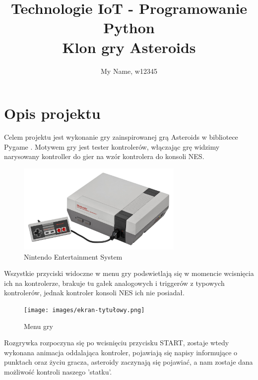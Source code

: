 \documentclass[12pt,a4paper]{article}
\begin{document}
\title{{
  \vspace{1.3cm}
  \LARGE Technologie IoT - Programowanie Python \\
  \LARGE Klon gry Asteroids}}
\author{{\Large My Name, w12345}}
\date{}
\maketitle
\newpage


\section{Opis projektu}
  Celem projektu jest wykonanie gry zainspirowanej grą Asteroids \cite{asteroids} w bibliotece Pygame \cite{pygame}. Motywem gry jest tester kontrolerów, włączając grę widzimy narysowany kontroller do gier na wzór kontrolera do konsoli NES.

  \begin{figure}[h!]
  \begin{center}
    \includegraphics[width=8cm]{images/NES-Console-Set.jpg}
  \end{center}
  \caption{Nintendo Entertainment System}
  \label{fig:nes}
  \end{figure}

\noindent Wszystkie przyciski widoczne w menu gry podswietlają się w momencie wcisnięcia ich na kontrolerze, brakuje tu gałek analogowych i triggerów z typowych kontrolerów, jednak kontroler konsoli NES ich nie posiadał.

    \begin{figure}[h!]
  \begin{center}
    \texttt{[image: images/ekran-tytułowy.png]}
  \end{center}
  \caption{Menu gry}
  \label{fig:nes}
  \end{figure}
  
\newpage
\noindent Rozgrywka rozpoczyna się po wcisnięciu przycisku START, zostaje wtedy wykonana animacja oddalająca kontroler, pojawiają się napisy informujące o punktach oraz życiu gracza, asteroidy zaczynają się pojawiać, a nam zostaje dana możliwość kontroli naszego 'statku'.
\end{document}
